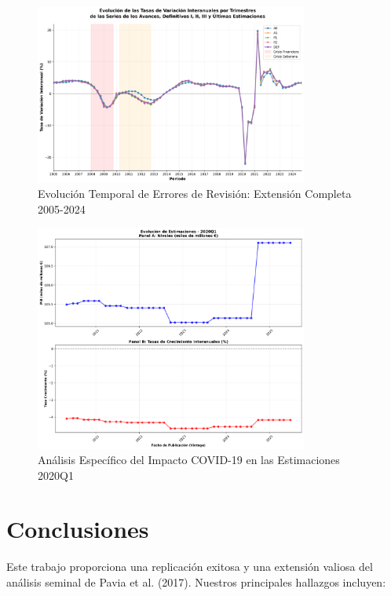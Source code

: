 \documentclass[12pt,a4paper]{article}
\begin{document}
\begin{figure}[h]
\centering
\includegraphics[width=0.8\textwidth]{../figuras/figura_2_pavia_robusta_2005_2024.png}
\caption{Evolución Temporal de Errores de Revisión: Extensión Completa 2005-2024}
\label{fig:evolucion_completa}
\end{figure}

\begin{figure}[h]
\centering
\includegraphics[width=0.8\textwidth]{../figuras/evolucion_estimaciones_2020Q1_robusto.png}
\caption{Análisis Específico del Impacto COVID-19 en las Estimaciones 2020Q1}
\label{fig:covid_impact}
\end{figure}

\section{Conclusiones}

Este trabajo proporciona una replicación exitosa y una extensión valiosa del análisis seminal de Pavia et al. (2017). Nuestros principales hallazgos incluyen:
\end{document}
